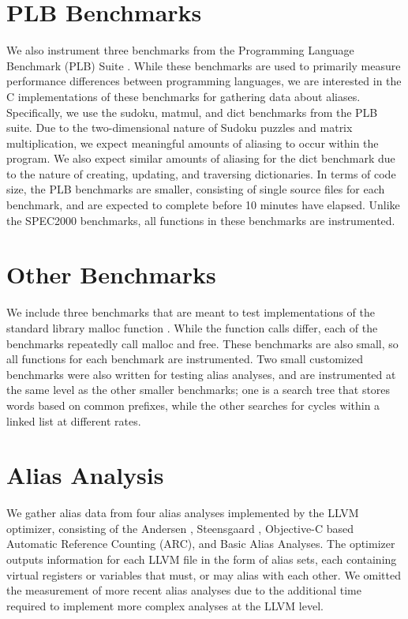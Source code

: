 \section{PLB Benchmarks}
We also instrument three benchmarks from the Programming Language Benchmark (PLB) Suite \cite{plb}. While these benchmarks are used to primarily measure performance differences between programming languages, we are interested in the C implementations of these benchmarks for gathering data about aliases. Specifically, we use the sudoku, matmul, and dict benchmarks from the PLB suite. Due to the two-dimensional nature of Sudoku puzzles and matrix multiplication, we expect meaningful amounts of aliasing to occur within the program. We also expect similar amounts of aliasing for the dict benchmark due to the nature of creating, updating, and traversing dictionaries. In terms of code size, the PLB benchmarks are smaller, consisting of single source files for each benchmark, and are expected to complete before 10 minutes have elapsed. Unlike the SPEC2000 benchmarks, all functions in these benchmarks are instrumented.

\section{Other Benchmarks}
We include three benchmarks that are meant to test implementations of the standard library malloc function \cite{malloc}. While the function calls differ, each of the benchmarks repeatedly call malloc and free. These benchmarks are also small, so all functions for each benchmark are instrumented. Two small customized benchmarks were also written for testing alias analyses, and are instrumented at the same level as the other smaller benchmarks; one is a search tree that stores words based on common prefixes, while the other searches for cycles within a linked list at different rates. 

\section{Alias Analysis}
We gather alias data from four alias analyses implemented by the LLVM optimizer, consisting of the Andersen \cite{Andersen}, Steensgaard \cite{Steensgaard}, Objective-C based Automatic Reference Counting (ARC), and Basic \cite{llvmaa} Alias Analyses. The optimizer outputs information for each LLVM file in the form of alias sets, each containing virtual registers or variables that must, or may alias with each other. We omitted the measurement of more recent alias analyses due to the additional time required to implement more complex analyses at the LLVM level.

